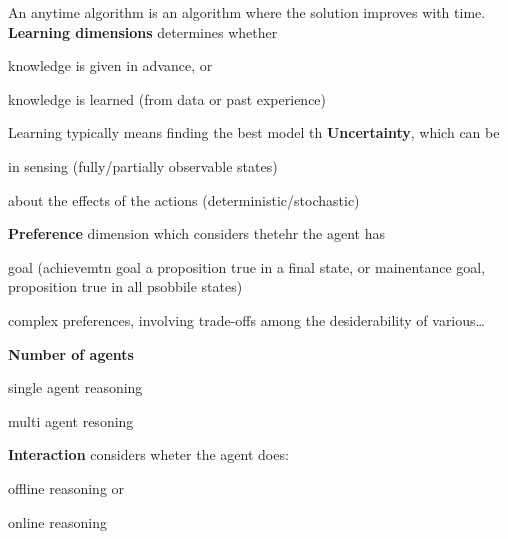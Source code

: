 \documentclass[10pt]{report}
\begin{document}
An anytime algorithm is an algorithm where the solution improves with time.\\
\textbf{Learning dimensions} determines whether \begin{list}{}{}
	\item knowledge is given in advance, or
	\item knowledge is learned (from data or past experience)
\end{list}
Learning typically means finding the best model th %
\textbf{Uncertainty}, which can be \begin{list}{}{}
	\item in sensing (fully/partially observable states)
	\item about the effects of the actions (deterministic/stochastic)
\end{list}
\textbf{Preference} dimension which considers thetehr the agent has
\begin{list}{}{}
	\item goal (achievemtn goal a proposition true in a final state, or mainentance goal, proposition true in all psobbile states)
	\item complex preferences, involving trade-offs among the desiderability of various\ldots %
\end{list}
\textbf{Number of agents}\begin{list}{}{}
	\item single agent reasoning
	\item multi agent resoning
\end{list}
\textbf{Interaction} considers wheter the agent does:
\begin{list}{}{}
	\item offline reasoning or
	\item online reasoning
\end{list}
\end{document}
